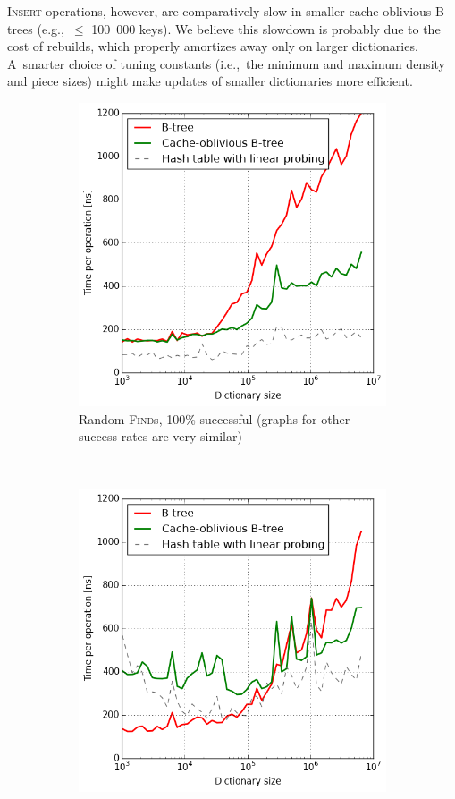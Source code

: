 \textsc{Insert} operations, however, are comparatively slow in
smaller cache-oblivious B-trees (e.g.,\ $\leq$ 100~000 keys). We believe
this slowdown is probably due to the cost of rebuilds, which properly
amortizes away only on larger dictionaries. A~smarter choice of tuning
constants (i.e.,\ the minimum and maximum density and piece sizes) might
make updates of smaller dictionaries more efficient.

\begin{figure}
\centering
\begin{subfigure}[t]{0.45\textwidth}
	\includegraphics[width=\textwidth]{img/performance/cob-performance-1-100}
	\caption{Random \textsc{Find}s, 100\% successful (graphs for
		other success rates are very similar)}
\end{subfigure}
~
\begin{subfigure}[t]{0.45\textwidth}
	\includegraphics[width=\textwidth]{img/performance/cob-performance-2}

\end{subfigure}
\end{figure}
